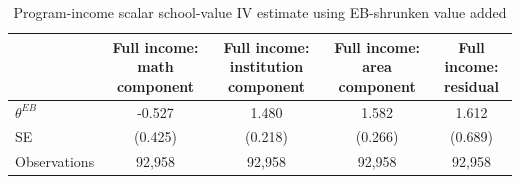 \begin{table}[!htbp]
\centering
\caption{Program-income scalar school-value IV estimate using EB-shrunken value added}
\label{tab:scalar_school_value_iv_program_income_expected_va_eb}
\begin{tabular}{lcccc}
\toprule
 & Full income: math component & Full income: institution component & Full income: area component & Full income: residual \\
\midrule
$\theta^{EB}$ & -0.527 & 1.480 & 1.582 & 1.612 \\
SE & (0.425) & (0.218) & (0.266) & (0.689) \\
Observations & 92,958 & 92,958 & 92,958 & 92,958 \\
\bottomrule
\end{tabular}
\end{table}
